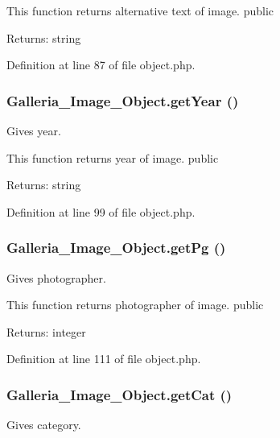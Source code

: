 This function returns alternative text of image.  public \begin{Desc}
\item[Returns:]string \end{Desc}


Definition at line 87 of file object.php.
\subsubsection{\setlength{\rightskip}{0pt plus 5cm}Galleria\_\-Image\_\-Object.getYear ()}\label{classGalleria__Image__Object_ad99f9513132d36ceedd1328ccc20800}


Gives year.

This function returns year of image.  public \begin{Desc}
\item[Returns:]string \end{Desc}


Definition at line 99 of file object.php.
\subsubsection{\setlength{\rightskip}{0pt plus 5cm}Galleria\_\-Image\_\-Object.getPg ()}\label{classGalleria__Image__Object_059d900448f2300b5c7d56acc1da3154}


Gives photographer.

This function returns photographer of image.  public \begin{Desc}
\item[Returns:]integer \end{Desc}


Definition at line 111 of file object.php.
\subsubsection{\setlength{\rightskip}{0pt plus 5cm}Galleria\_\-Image\_\-Object.getCat ()}\label{classGalleria__Image__Object_0ae3120b1c7cdee43e8f3bb5745ce410}


Gives category.

